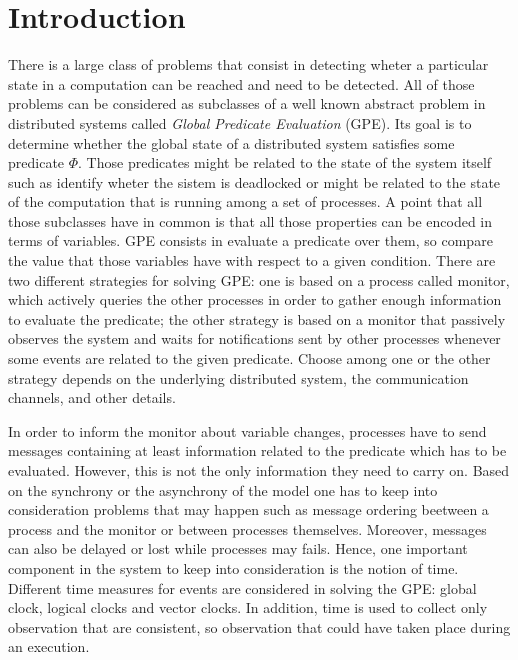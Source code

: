 \documentclass[11pt]{article}
\begin{document}


{}
\setcounter{page}{1}
\section{Introduction}

There is a large class of problems that consist in detecting wheter a particular state in a computation can be reached and need to be detected.
All of those problems can be considered as subclasses of a well known abstract problem in distributed systems called \textit{Global Predicate Evaluation} (GPE). Its goal is to determine whether the global state of a distributed system satisfies some predicate $\Phi$. Those predicates might be related to the state of the system itself such as identify wheter the sistem is deadlocked or might be related to the state of the computation that is running among a set of processes. A point that all those subclasses have in common is that all those properties can be encoded in terms of variables. GPE consists in evaluate a predicate over them, so compare the value that those variables have with respect to a given condition. There are two different strategies for solving GPE: one is based on a process called monitor, which actively queries the other processes in order to gather enough information to evaluate the predicate; the other strategy is based on a monitor that passively observes the system and waits for notifications sent by other processes whenever some events are related to the given predicate. Choose among one or the other strategy depends on the underlying distributed system, the communication channels, and other details.

In order to inform the monitor about variable changes, processes have to send messages containing at least information related to the predicate which has to be evaluated. However, this is not the only information they need to carry on. Based on the synchrony or the asynchrony of the model one has to keep into consideration problems that may happen such as message ordering beetween a process and the monitor or between processes themselves. Moreover, messages can also be delayed or lost while processes may fails. Hence, one important component in the system to keep into consideration is the notion of time. Different time measures for events are considered in solving the GPE: global clock, logical clocks and vector clocks. In addition, time is used to collect only observation that are consistent, so observation that could have taken place during an execution.
\end{document}
